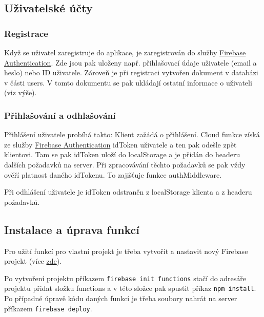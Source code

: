 \documentclass[a4paper,12pt]{article}
\begin{document}
\subsection{Uživatelské účty}
\subsubsection{Registrace}
Když se uživatel zaregistruje do aplikace, je zaregistrován do služby \href{https://firebase.google.com/docs/auth}{Firebase Authentication}. Zde jsou pak uloženy např. přihlašovací údaje uživatele (email a heslo) nebo ID uživatele. Zároveň je při registraci vytvořen dokument v databázi v části users. V tomto dokumentu se pak ukládají ostatní informace o uživateli (viz výše).

\subsubsection{Přihlašování a odhlašování}
Přihlášení uživatele probíhá takto: Klient zažádá o přihlášení. Cloud funkce získá ze služby \href{https://firebase.google.com/docs/auth}{Firebase Authentication} idToken uživatele a ten pak odešle zpět klientovi. Tam se pak idToken uloží do localStorage a je přidán do headeru dalších požadavků na server. Při zpracovávání těchto požadavků se pak vždy ověří platnost daného idTokenu. To zajišťuje funkce authMiddleware.

Při odhlášení uživatele je idToken odstraněn z localStorage klienta a z headeru požadavků.

\subsection{Instalace a úprava funkcí}
Pro užití funkcí pro vlastní projekt je třeba vytvořit a nastavit nový Firebase projekt (více \href{https://firebase.google.com/docs/functions/get-started}{zde}).

Po vytvoření projektu příkazem \verb|firebase init functions| stačí do adresáře projektu přidat složku functions a v této složce pak spustit příkaz  \verb|npm install|. Po případné úpravě kódu daných funkcí je třeba soubory nahrát na server příkazem  \verb|firebase deploy|.
\end{document}
